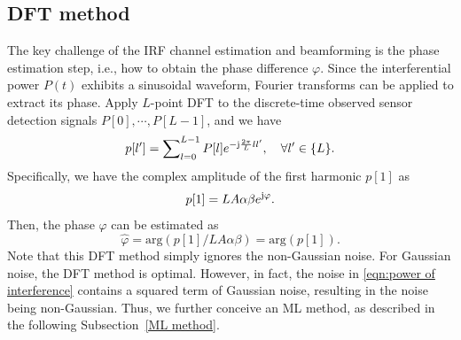 \documentclass[conference,10pt,twocolumn]{IEEEtran}
\theoremstyle{nonumberplain}
\def \arg {\text{arg}}
\begin{document}
\subsection{DFT method}  \label{DFT method}
    The key challenge of the IRF channel estimation and beamforming is the phase estimation step, i.e., how to obtain the phase difference $\varphi$. Since the interferential power $P(t)$ exhibits a sinusoidal waveform, Fourier transforms can be applied to extract its phase. Apply $L$-point \ac{DFT} to the discrete-time  observed sensor detection signals $P[0],\cdots ,P[L-1]$, and we have
    \begin{equation}
        \label{DFT}
        p[l']=\sum\nolimits_{l=0}^{L-1}P[l]e^{-{\rm j}\frac{2\pi}{L}ll'},\quad \forall l'\in \{L\}.
    \end{equation}
    Specifically, we have the complex amplitude of the first harmonic $p[1]$ as 
    \begin{equation}
        \label{DFT l=1}
        p[1]=LA\alpha\beta  e^{{\rm j}\varphi}.
    \end{equation}
    Then, the phase $\varphi$ can be estimated as
    \begin{equation}
        \label{LS estimate result}
        \hat{\varphi}=\arg\left(p[1]/LA\alpha\beta\right) = \arg\left(p[1]\right).
    \end{equation}
    Note that this DFT method simply ignores the non-Gaussian noise. For Gaussian noise, the DFT method is optimal. However, in fact, the noise in \eqref{eqn:power of interference} contains a squared term of Gaussian noise, resulting in the noise being non-Gaussian. Thus, we further conceive an ML method, as described in the following Subsection~\ref{ML method}. 
\end{document}
